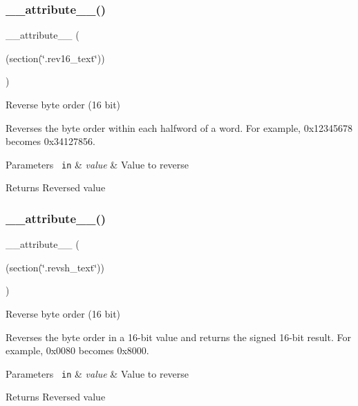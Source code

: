 \subsubsection{\texorpdfstring{\_\_attribute\_\_()}{\_\_attribute\_\_()}\hspace{0.1cm}{\footnotesize\ttfamily [1/3]}}
{\footnotesize\ttfamily \+\_\+\+\_\+attribute\+\_\+\+\_\+ (\begin{DoxyParamCaption}\item[{(section(\char`\"{}.rev16\+\_\+text\char`\"{}))}]{ }\end{DoxyParamCaption})}



Reverse byte order (16 bit) 

Reverses the byte order within each halfword of a word. For example, 0x12345678 becomes 0x34127856. 
\begin{DoxyParams}[1]{Parameters}
\mbox{\texttt{ in}}  & {\em value} & Value to reverse \\
\hline
\end{DoxyParams}
\begin{DoxyReturn}{Returns}
Reversed value 
\end{DoxyReturn}
\mbox{\label{group___c_m_s_i_s___core___instruction_interface_gabe2b619a40cc0a7ffa8f765249ccf682}} 
\subsubsection{\texorpdfstring{\_\_attribute\_\_()}{\_\_attribute\_\_()}\hspace{0.1cm}{\footnotesize\ttfamily [2/3]}}
{\footnotesize\ttfamily \+\_\+\+\_\+attribute\+\_\+\+\_\+ (\begin{DoxyParamCaption}\item[{(section(\char`\"{}.revsh\+\_\+text\char`\"{}))}]{ }\end{DoxyParamCaption})}



Reverse byte order (16 bit) 

Reverses the byte order in a 16-\/bit value and returns the signed 16-\/bit result. For example, 0x0080 becomes 0x8000. 
\begin{DoxyParams}[1]{Parameters}
\mbox{\texttt{ in}}  & {\em value} & Value to reverse \\
\hline
\end{DoxyParams}
\begin{DoxyReturn}{Returns}
Reversed value 
\end{DoxyReturn}
\mbox{\label{group___c_m_s_i_s___core___instruction_interface_gab926fe7178a379c3a7c0410b06fcb661}} 
